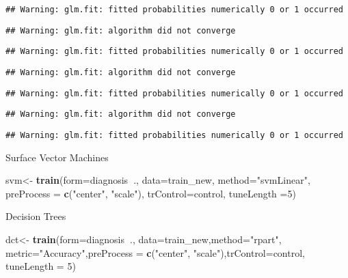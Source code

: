 \documentclass[]{article}
\newenvironment{Shaded}{\begin{snugshade}}{\end{snugshade}}
\newcommand{\DataTypeTok}[1]{\textcolor[rgb]{0.13,0.29,0.53}{#1}}
\newcommand{\DecValTok}[1]{\textcolor[rgb]{0.00,0.00,0.81}{#1}}
\newcommand{\KeywordTok}[1]{\textcolor[rgb]{0.13,0.29,0.53}{\textbf{#1}}}
\newcommand{\NormalTok}[1]{#1}
\newcommand{\OperatorTok}[1]{\textcolor[rgb]{0.81,0.36,0.00}{\textbf{#1}}}
\newcommand{\StringTok}[1]{\textcolor[rgb]{0.31,0.60,0.02}{#1}}
\begin{document}
\begin{verbatim}
## Warning: glm.fit: fitted probabilities numerically 0 or 1 occurred
\end{verbatim}

\begin{verbatim}
## Warning: glm.fit: algorithm did not converge
\end{verbatim}

\begin{verbatim}
## Warning: glm.fit: fitted probabilities numerically 0 or 1 occurred
\end{verbatim}

\begin{verbatim}
## Warning: glm.fit: algorithm did not converge
\end{verbatim}

\begin{verbatim}
## Warning: glm.fit: fitted probabilities numerically 0 or 1 occurred
\end{verbatim}

\begin{verbatim}
## Warning: glm.fit: algorithm did not converge
\end{verbatim}

\begin{verbatim}
## Warning: glm.fit: fitted probabilities numerically 0 or 1 occurred
\end{verbatim}

Surface Vector Machines

\begin{Shaded}
\begin{Highlighting}[]
\NormalTok{svm<-}\StringTok{ }\KeywordTok{train}\NormalTok{(}\DataTypeTok{form=}\NormalTok{diagnosis}\OperatorTok{~}\NormalTok{., }\DataTypeTok{data=}\NormalTok{train_new, }\DataTypeTok{method=}\StringTok{"svmLinear"}\NormalTok{, }\DataTypeTok{preProcess =} \KeywordTok{c}\NormalTok{(}\StringTok{"center"}\NormalTok{, }\StringTok{"scale"}\NormalTok{), }\DataTypeTok{trControl=}\NormalTok{control, }\DataTypeTok{tuneLength =}\DecValTok{5}\NormalTok{)}
\end{Highlighting}
\end{Shaded}

Decision Trees

\begin{Shaded}
\begin{Highlighting}[]
\NormalTok{dct<-}\StringTok{ }\KeywordTok{train}\NormalTok{(}\DataTypeTok{form=}\NormalTok{diagnosis}\OperatorTok{~}\NormalTok{., }\DataTypeTok{data=}\NormalTok{train_new,}\DataTypeTok{method=}\StringTok{"rpart"}\NormalTok{, }\DataTypeTok{metric=}\StringTok{"Accuracy"}\NormalTok{,}\DataTypeTok{preProcess =} \KeywordTok{c}\NormalTok{(}\StringTok{"center"}\NormalTok{, }\StringTok{"scale"}\NormalTok{),}\DataTypeTok{trControl=}\NormalTok{control, }\DataTypeTok{tuneLength =} \DecValTok{5}\NormalTok{)}
\end{Highlighting}
\end{Shaded}
\end{document}
